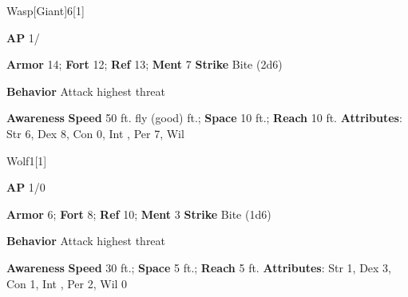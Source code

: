 \begin{monsection}{Wasp}[Giant]{6}[1]
\vspace{-1em}\vspace{-1em}
\begin{spellcontent}
\begin{spelltargetinginfo}
{\textbf{AP} 1/}

\pari \textbf{Armor} 14;
\textbf{Fort} 12;
\textbf{Ref} 13;
\textbf{Ment} 7
\pari \textbf{Strike} Bite  (2d6)



\pari \textbf{Behavior} Attack highest threat
\end{spelltargetinginfo}
\end{spellcontent}

\begin{monsterfooter}
\pari \textbf{Awareness} 
\pari \textbf{Speed} 50 ft. fly (good) ft.;
\textbf{Space} 10 ft.;
\textbf{Reach} 10 ft.
\pari \textbf{Attributes}:
Str 6,
Dex 8,
Con 0,
Int ,
Per 7,
Wil 
\end{monsterfooter}
\end{monsection}

\begin{monsection}{Wolf}{1}[1]
\vspace{-1em}\vspace{-1em}
\begin{spellcontent}
\begin{spelltargetinginfo}
{\textbf{AP} 1/0}

\pari \textbf{Armor} 6;
\textbf{Fort} 8;
\textbf{Ref} 10;
\textbf{Ment} 3
\pari \textbf{Strike} Bite  (1d6)



\pari \textbf{Behavior} Attack highest threat
\end{spelltargetinginfo}
\end{spellcontent}

\begin{monsterfooter}
\pari \textbf{Awareness} 
\pari \textbf{Speed} 30 ft.;
\textbf{Space} 5 ft.;
\textbf{Reach} 5 ft.
\pari \textbf{Attributes}:
Str 1,
Dex 3,
Con 1,
Int ,
Per 2,
Wil 0
\end{monsterfooter}
\end{monsection}

